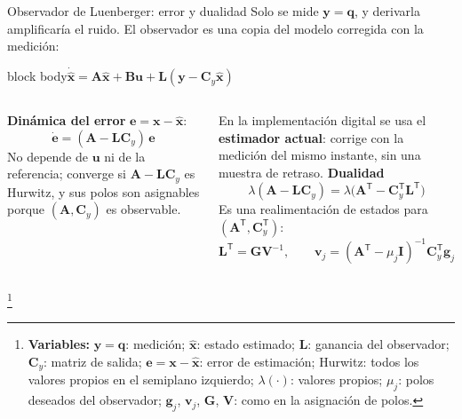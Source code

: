 \documentclass[aspectratio=169,10pt]{beamer}
\newcommand{\vect}[1]{\bm{#1}}
\newcommand{\T}{^{\mathsf{T}}}
\newcommand{\variables}[1]{\begingroup\renewcommand{\thefootnote}{}\footnote[frame]{\textbf{Variables:} #1}\addtocounter{footnote}{-1}\endgroup}
\newcommand{\resultado}[1]{\par\smallskip\begin{beamercolorbox}[rounded=true,sep=0.45em,center]{block body}#1\end{beamercolorbox}\par\smallskip}
\begin{document}
\begin{frame}{Observador de Luenberger: error y dualidad}
\small
Solo se mide $\vect y = \vect q$, y derivarla amplificaría el ruido. El observador es una copia del modelo corregida con la medición:
\resultado{$\dot{\hat{\vect x}} = \vect A\hat{\vect x} + \vect B\vect u + \vect L(\vect y - \vect C_y\hat{\vect x})$}
\begin{columns}[T]
\textbf{Dinámica del error} $\vect e = \vect x - \hat{\vect x}$:
\[
\dot{\vect e} = (\vect A - \vect L\vect C_y)\,\vect e
\]
No depende de $\vect u$ ni de la referencia; converge si $\vect A - \vect L\vect C_y$ es Hurwitz, y sus polos son asignables porque $(\vect A, \vect C_y)$ es observable.

En la implementación digital se usa el \textbf{estimador actual}: corrige con la medición del mismo instante, sin una muestra de retraso.
\textbf{Dualidad}
\[
\lambda(\vect A - \vect L\vect C_y) = \lambda\big(\vect A\T - \vect C_y\T\vect L\T\big)
\]
Es una realimentación de estados para $(\vect A\T, \vect C_y\T)$:
\[
\vect L\T = \vect G\vect V^{-1},\qquad \vect v_j = (\vect A\T - \mu_j\vect I)^{-1}\vect C_y\T\vect g_j
\]
\end{columns}
\variables{$\vect y = \vect q$: medición; $\hat{\vect x}$: estado estimado; $\vect L$: ganancia del observador; $\vect C_y$: matriz de salida; $\vect e = \vect x - \hat{\vect x}$: error de estimación; Hurwitz: todos los valores propios en el semiplano izquierdo; $\lambda(\cdot)$: valores propios; $\mu_j$: polos deseados del observador; $\vect g_j$, $\vect v_j$, $\vect G$, $\vect V$: como en la asignación de polos.}
\end{frame}
\end{document}
